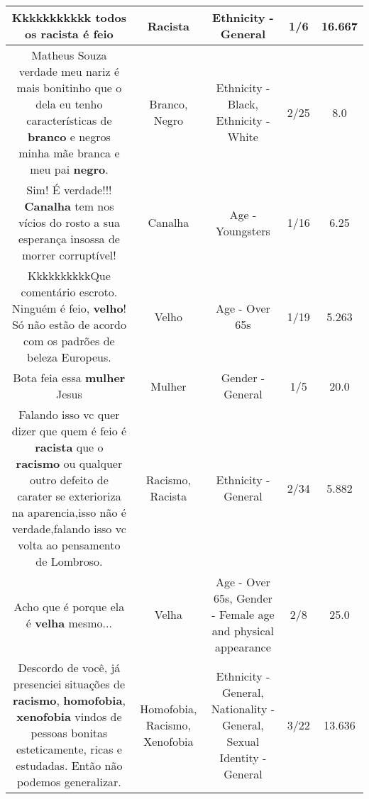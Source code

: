 \documentclass[11pt]{article}
\newlength\mylength
\begin{document}
\begin{center}
\begin{longtable}{|C{.65\mylength}|C{.30\mylength}|C{.12\mylength}|C{.12\mylength}|C{.12\mylength}|}
  \small Kkkkkkkkkkk  todos  os \textbf{racista} é  feio\normalsize   & Racista & Ethnicity - General & 1/6 & 16.667 \\  \hline
  \small Matheus Souza  verdade  meu nariz é  mais bonitinho que o dela eu tenho características  de \textbf{branco}  e negros minha mãe  branca  e meu pai \textbf{negro}.\normalsize   & Branco, Negro & Ethnicity - Black, Ethnicity - White & 2/25 & 8.0 \\  \hline
  \small Sim! É verdade!!! \textbf{Canalha} tem nos vícios do rosto a sua esperança insossa de morrer corruptível!\normalsize   & Canalha & Age - Youngsters & 1/16 & 6.25 \\  \hline
  \small KkkkkkkkkkQue comentário escroto. Ninguém é feio, \textbf{velho}! Só não estão de acordo com os padrões de beleza Europeus.\normalsize   & Velho & Age - Over 65s & 1/19 & 5.263 \\  \hline
  \small Bota feia essa \textbf{mulher} Jesus\normalsize   & Mulher & Gender - General & 1/5 & 20.0 \\  \hline
  \small Falando isso vc quer dizer que quem é feio é  \textbf{racista} que o \textbf{racismo} ou qualquer outro defeito de carater se exterioriza na aparencia,isso não é verdade,falando isso vc volta ao pensamento de Lombroso.\normalsize   & Racismo, Racista & Ethnicity - General & 2/34 & 5.882 \\  \hline
  \small Acho que é porque ela é \textbf{v\textbf{elha}} mesmo...\normalsize   & Velha & Age - Over 65s, Gender - Female age and physical appearance & 2/8 & 25.0 \\  \hline
  \small Descordo de você, já presenciei situações de \textbf{racismo}, \textbf{homofobia}, \textbf{xenofobia} vindos de pessoas bonitas esteticamente, ricas e estudadas. Então não podemos generalizar.\normalsize   & Homofobia, Racismo, Xenofobia & Ethnicity - General, Nationality - General, Sexual Identity - General & 3/22 & 13.636 \\  \hline

\end{longtable}
\end{center}
\end{document}
